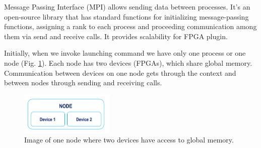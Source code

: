 Message Passing Interface (MPI) allows sending data between processes. It’s an open-source library that has standard functions for initializing message-passing functions, assigning a rank to each process and proceeding communication among them via send and receive calls. It provides scalability for FPGA plugin.


Initially, when we invoke launching command we have only one process or one node (Fig. \ref{fig:node}). Each node has two devices (FPGAs), which share global memory. Communication between devices on one node gets through the context and between nodes through sending and receiving calls.

\begin{figure}[!htb]
  \centering
  \includegraphics[width=0.4\textwidth,height=0.4\textheight,keepaspectratio]{img/node.png}
  \caption{Image of one node where two devices have access to global memory.}
  \label{fig:node}
\end{figure}
